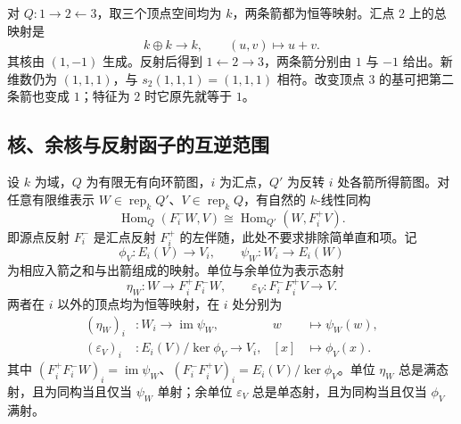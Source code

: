 \begin{example}\label{b5:exm:a3-sink-reflection}
	对 \(Q:1\to2\leftarrow3\)，取三个顶点空间均为 \(k\)，两条箭都为恒等映射。汇点 \(2\) 上的总映射是
	\[
		k\oplus k\longrightarrow k,\qquad (u,v)\longmapsto u+v.
	\]
	其核由 \((1,-1)\) 生成。反射后得到 \(1\leftarrow2\to3\)，两条箭分别由 \(1\) 与 \(-1\) 给出。新维数仍为 \((1,1,1)\)，与 \(s_2(1,1,1)=(1,1,1)\) 相符。改变顶点 \(3\) 的基可把第二条箭也变成 \(1\)；特征为 \(2\) 时它原先就等于 \(1\)。
\end{example}

\subsection{核、余核与反射函子的互逆范围}
\label{b5:subsec:1002:04}

\begin{proposition}[反射伴随]\label{b5:prop:reflection-adjunction}
	设 \(k\) 为域，\(Q\) 为有限无有向环箭图，\(i\) 为汇点，\(Q'\) 为反转 \(i\) 处各箭所得箭图。对任意有限维表示 \(W\in\operatorname{rep}_k Q'\)、\(V\in\operatorname{rep}_k Q\)，有自然的 \(k\)-线性同构
	\[
		\operatorname{Hom}_Q(F_i^-W,V) \cong\operatorname{Hom}_{Q'}(W,F_i^+V).
	\]
	即源点反射 \(F_i^-\) 是汇点反射 \(F_i^+\) 的左伴随，此处不要求排除简单直和项。记
	\[
		\phi_V:E_i(V)\longrightarrow V_i,\qquad \psi_W:W_i\longrightarrow E_i(W)
	\]
	为相应入箭之和与出箭组成的映射。单位与余单位为表示态射
	\[
		\eta_W:W\longrightarrow F_i^+F_i^-W,\qquad \varepsilon_V:F_i^-F_i^+V\longrightarrow V.
	\]
	两者在 \(i\) 以外的顶点均为恒等映射，在 \(i\) 处分别为
	\[
		\begin{aligned}
			(\eta_W)_i &: W_i\longrightarrow\operatorname{im}\psi_W, &w&\longmapsto\psi_W(w),\\
			(\varepsilon_V)_i &: E_i(V)/\ker\phi_V\longrightarrow V_i, &[x]&\longmapsto\phi_V(x).
		\end{aligned}
	\]
	其中 \((F_i^+F_i^-W)_i=\operatorname{im}\psi_W\)、\((F_i^-F_i^+V)_i=E_i(V)/\ker\phi_V\)。单位 \(\eta_W\) 总是满态射，且为同构当且仅当 \(\psi_W\) 单射；余单位 \(\varepsilon_V\) 总是单态射，且为同构当且仅当 \(\phi_V\) 满射。
\end{proposition}
